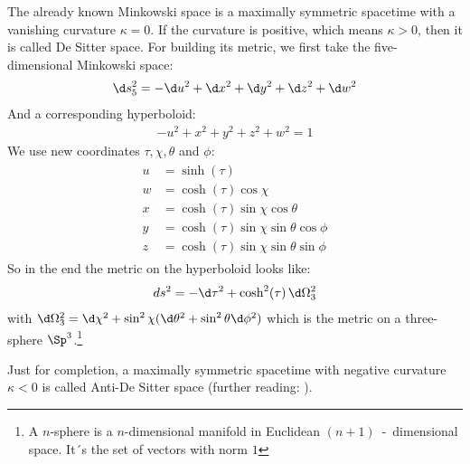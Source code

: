 	The already known Minkowski space is a maximally symmetric spacetime with a vanishing curvature $\kappa = 0$. If the curvature is positive, which means $\kappa > 0$, then it is called De Sitter space. For building its metric, we first take the five-dimensional Minkowski space:
		\begin{align}
			\d s^2_5 = -\d u^2 + \d x^2 + \d y^2 + \d z^2 + \d w^2
		\end{align}
	And a corresponding hyperboloid:
		\begin{align}
			-u^2 + x^2 + y^2 + z^2 + w^2 = 1
		\end{align}
	We use new coordinates $\tau, \chi, \theta$ and $\phi$:
		\begin{align}
			\begin{split}
			u &= \sinh (\tau) \\
			w &= \cosh (\tau) \cos \chi \\
			x &= \cosh (\tau) \sin \chi \cos \theta \\
			y &= \cosh (\tau) \sin \chi \sin \theta \cos \phi \\
			z &= \cosh (\tau) \sin \chi \sin \theta \sin \phi
			\end{split}
		\end{align}
	So in the end the metric on the hyperboloid looks like:
		\begin{align} \label{de-sitter}
			ds^2 = -\d \tau^2 + \cosh^2(\tau) \, \d \Omega^2_3 
		\end{align}
	with $\d \Omega_3^2 = \d \chi^2 + \sin^2 \chi (\d \theta^2 + \sin^2 \theta \d \phi^2)$
	which is the metric on a three-sphere $\Sp^3$.\footnote{A $n$-sphere is a $n$-dimensional manifold in Euclidean $(n+1)$~-~dimensional space. It´s the set of vectors with norm $1$}
	
	Just for completion, a maximally symmetric spacetime with negative curvature $\kappa < 0$ is called Anti-De Sitter space (further reading: \cite{SpacetimeCarroll}).